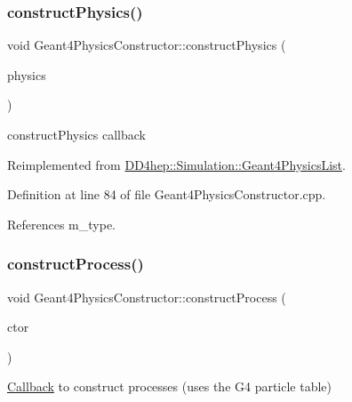 \subsubsection{\texorpdfstring{construct\+Physics()}{constructPhysics()}}
{\footnotesize\ttfamily void Geant4\+Physics\+Constructor\+::construct\+Physics (\begin{DoxyParamCaption}\item[{G4\+V\+Modular\+Physics\+List $\ast$}]{physics }\end{DoxyParamCaption})\hspace{0.3cm}{\ttfamily [virtual]}}



construct\+Physics callback 



Reimplemented from \hyperlink{class_d_d4hep_1_1_simulation_1_1_geant4_physics_list_ac930c930b12719772ec5119cdec72ef1}{D\+D4hep\+::\+Simulation\+::\+Geant4\+Physics\+List}.



Definition at line 84 of file Geant4\+Physics\+Constructor.\+cpp.



References m\+\_\+type.

\hypertarget{class_d_d4hep_1_1_simulation_1_1_geant4_physics_constructor_a11d516af4f7dcfefe4fa7f154cba4386}{}\label{class_d_d4hep_1_1_simulation_1_1_geant4_physics_constructor_a11d516af4f7dcfefe4fa7f154cba4386} 
\subsubsection{\texorpdfstring{construct\+Process()}{constructProcess()}}
{\footnotesize\ttfamily void Geant4\+Physics\+Constructor\+::construct\+Process (\begin{DoxyParamCaption}\item[{\hyperlink{class_d_d4hep_1_1_simulation_1_1_geant4_physics_constructor_1_1_constructor}{Constructor} \&}]{ctor }\end{DoxyParamCaption})\hspace{0.3cm}{\ttfamily [virtual]}}



\hyperlink{class_d_d4hep_1_1_callback}{Callback} to construct processes (uses the G4 particle table) 



